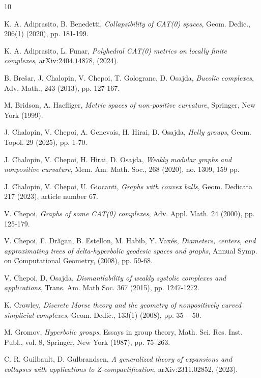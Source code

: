 \documentclass{amsart}
\theoremstyle{definition}
\theoremstyle{remark}
\numberwithin{equation}{section}
\begin{document}
\begin{thebibliography}{10}


K. A. Adiprasito, B. Benedetti, \emph{Collapsibility of CAT(0) spaces}, Geom. Dedic., 206(1) (2020), pp. 181-199.

K. A. Adiprasito, L. Funar, \emph{Polyhedral CAT(0) metrics on locally finite complexes}, arXiv:$2404.14878$, (2024).



B. Bre{\v{s}}ar, J. Chalopin, V. Chepoi, T. Gologranc, D. Osajda, 
\emph{Bucolic complexes},
Adv. Math., 243 (2013), 
pp. 127-167.

M. Bridson, A. Haefliger,
\emph{Metric spaces of non-positive curvature},
Springer, New York (1999).



J. Chalopin, V. Chepoi, A. Genevois, H. Hirai, D. Osajda,
\emph{Helly groups}, Geom. Topol. 29 (2025), pp. 1-70.


J. Chalopin, V. Chepoi, H. Hirai, D. Osajda,
\emph{Weakly modular graphs and nonpositive curvature},
Mem. Am. Math. Soc., 268 (2020), no. 1309, 159 pp.


J. Chalopin, V. Chepoi, U. Giocanti,
\emph{Graphs with convex balls},
Geom. Dedicata 217 (2023), article number 67.


V. Chepoi,
\emph{Graphs of some CAT(0) complexes},
Adv. Appl. Math. 24 (2000), pp. 125-179.

V. Chepoi, F. Dr\u{a}gan, B. Estellon, M. Habib, Y. Vax\'es, \emph{Diameters, centers, and approximating trees of delta-hyperbolic geodesic spaces and graphs},
Annual Symp. on Computational
Geometry, (2008), pp. 59-68.

V. Chepoi, D. Osajda,
\emph{Dismantlability of weakly systolic complexes and applications},
Trans. Am. Math Soc. 367 (2015), pp. 1247-1272.


K. Crowley, \emph{ Discrete Morse theory and the geometry of
nonpositively curved simplicial complexes}, Geom. Dedic.,  133(1) (2008), pp. $35-50$.


M. Gromov, \emph{Hyperbolic groups}, Essays in group theory, Math. Sci. Res. Inst. Publ., vol. 8,
Springer, New York (1987), pp. 75–263.

C. R. Guilbault, D. Gulbrandsen, \emph{A generalized theory of expansions and collapses with applications to Z-compactification},
arXiv:2311.02852, (2023).


\end{thebibliography}
\end{document}
